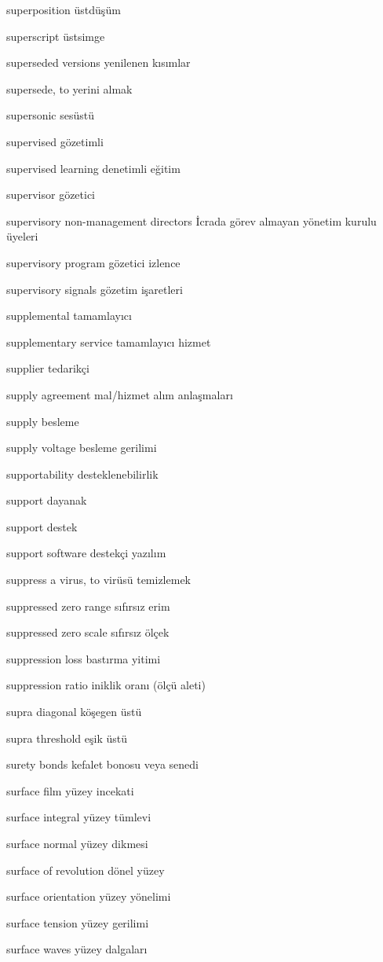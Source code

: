 \documentclass[12pt,fleqn]{article}\usepackage{../../common}
\begin{document}
superposition üstdüşüm

superscript üstsimge

superseded versions yenilenen kısımlar

supersede, to yerini almak

supersonic sesüstü

supervised gözetimli

supervised learning denetimli eğitim

supervisor gözetici

supervisory non-management directors İcrada görev almayan yönetim kurulu üyeleri

supervisory program gözetici izlence

supervisory signals gözetim işaretleri

supplemental tamamlayıcı

supplementary service tamamlayıcı hizmet

supplier tedarikçi

supply agreement mal/hizmet alım anlaşmaları

supply besleme

supply voltage besleme gerilimi

supportability desteklenebilirlik

support dayanak

support destek

support software destekçi yazılım

suppress a virus, to virüsü temizlemek

suppressed zero range sıfırsız erim

suppressed zero scale sıfırsız ölçek

suppression loss bastırma yitimi

suppression ratio iniklik oranı (ölçü aleti)

supra diagonal köşegen üstü

supra threshold eşik üstü

surety bonds kefalet bonosu veya senedi

surface film yüzey incekati

surface integral yüzey tümlevi

surface normal yüzey dikmesi

surface of revolution dönel yüzey

surface orientation yüzey yönelimi

surface tension yüzey gerilimi

surface waves yüzey dalgaları
\end{document}
